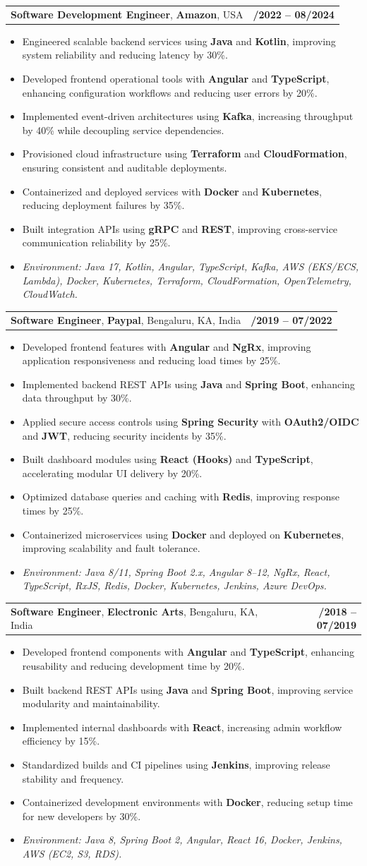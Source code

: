 \documentclass[letterpaper,11pt]{article}
\makeatletter
\newcommand{\resumeItem}[1]{
  \item\footnotesize{
    {#1 \vspace{-2pt}}
  }
}
\newcommand{\resumeSubheading}[4]{
  \vspace{-2pt}\item
    \begin{tabular*}{1.0\textwidth}[t]{l@{\extracolsep{\fill}}r}
      \textbf{\fontsize{10pt}{14pt}\selectfont #3}, \textbf{\fontsize{10pt}{14pt}\selectfont #1}, \fontsize{10pt}{14pt}\selectfont #4 & \textbf{\fontsize{10pt}{14pt}\selectfont #2} \\
    \end{tabular*}\vspace{-7pt}
}
\newcommand{\resumeItemListStart}{\begin{itemize}[leftmargin=*]}
\newcommand{\resumeItemListEnd}{\end{itemize}\vspace{-5pt}}
\makeatother
\begin{document}
\resumeSubheading
{Amazon}{10/2022 -- 08/2024}
{Software Development Engineer}{USA}
\resumeItemListStart
  \resumeItem{Engineered scalable backend services using \textbf{Java} and \textbf{Kotlin}, improving system reliability and reducing latency by 30\%.}
  \resumeItem{Developed frontend operational tools with \textbf{Angular} and \textbf{TypeScript}, enhancing configuration workflows and reducing user errors by 20\%.}
  \resumeItem{Implemented event-driven architectures using \textbf{Kafka}, increasing throughput by 40\% while decoupling service dependencies.}
  \resumeItem{Provisioned cloud infrastructure using \textbf{Terraform} and \textbf{CloudFormation}, ensuring consistent and auditable deployments.}
  \resumeItem{Containerized and deployed services with \textbf{Docker} and \textbf{Kubernetes}, reducing deployment failures by 35\%.}
  \resumeItem{Built integration APIs using \textbf{gRPC} and \textbf{REST}, improving cross-service communication reliability by 25\%.}
  \resumeItem{\textit{Environment: Java 17, Kotlin, Angular, TypeScript, Kafka, AWS (EKS/ECS, Lambda), Docker, Kubernetes, Terraform, CloudFormation, OpenTelemetry, CloudWatch.}}
\resumeItemListEnd

\resumeSubheading
{Paypal}{08/2019 -- 07/2022}
{Software Engineer}{Bengaluru, KA, India}
\resumeItemListStart
  \resumeItem{Developed frontend features with \textbf{Angular} and \textbf{NgRx}, improving application responsiveness and reducing load times by 25\%.}
  \resumeItem{Implemented backend REST APIs using \textbf{Java} and \textbf{Spring Boot}, enhancing data throughput by 30\%.}
  \resumeItem{Applied secure access controls using \textbf{Spring Security} with \textbf{OAuth2/OIDC} and \textbf{JWT}, reducing security incidents by 35\%.}
  \resumeItem{Built dashboard modules using \textbf{React (Hooks)} and \textbf{TypeScript}, accelerating modular UI delivery by 20\%.}
  \resumeItem{Optimized database queries and caching with \textbf{Redis}, improving response times by 25\%.}
  \resumeItem{Containerized microservices using \textbf{Docker} and deployed on \textbf{Kubernetes}, improving scalability and fault tolerance.}
  \resumeItem{\textit{Environment: Java 8/11, Spring Boot 2.x, Angular 8--12, NgRx, React, TypeScript, RxJS, Redis, Docker, Kubernetes, Jenkins, Azure DevOps.}}
\resumeItemListEnd

\resumeSubheading
{Electronic Arts}{01/2018 -- 07/2019}
{Software Engineer}{Bengaluru, KA, India}
\resumeItemListStart
  \resumeItem{Developed frontend components with \textbf{Angular} and \textbf{TypeScript}, enhancing reusability and reducing development time by 20\%.}
  \resumeItem{Built backend REST APIs using \textbf{Java} and \textbf{Spring Boot}, improving service modularity and maintainability.}
  \resumeItem{Implemented internal dashboards with \textbf{React}, increasing admin workflow efficiency by 15\%.}
  \resumeItem{Standardized builds and CI pipelines using \textbf{Jenkins}, improving release stability and frequency.}
  \resumeItem{Containerized development environments with \textbf{Docker}, reducing setup time for new developers by 30\%.}
  \resumeItem{\textit{Environment: Java 8, Spring Boot 2, Angular, React 16, Docker, Jenkins, AWS (EC2, S3, RDS).}}
\resumeItemListEnd
\end{document}
